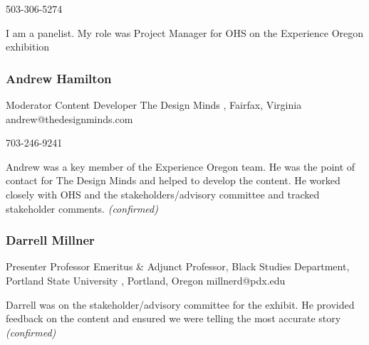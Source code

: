 \documentclass{report}
\begin{document}
              503-306-5274\newline

              I am a panelist. My role was Project Manager for OHS on the Experience Oregon exhibition\newline


              
                \subsubsection*{ Andrew Hamilton }
                Moderator\newline
                Content Developer \newline
                The Design Minds , Fairfax, Virginia 
                \newline
                andrew@thedesignminds.com\newline
                
                703-246-9241\newline

                Andrew was a key member of the Experience Oregon team. He was the point of contact for The Design Minds and helped to develop the content. He worked closely with OHS and the stakeholders/advisory committee and tracked stakeholder comments.\newline
                \emph{ (confirmed) }
              

              
                \subsubsection*{ Darrell Millner  }
                Presenter\newline
                Professor Emeritus & Adjunct Professor, Black Studies Department,\newline
                Portland State University , Portland, Oregon 
                \newline
                millnerd@pdx.edu\newline
                
                

                Darrell was on the stakeholder/advisory committee for the exhibit. He provided feedback on the content and ensured we were telling the most accurate story
                \emph{ (confirmed) }
              
\end{document}
